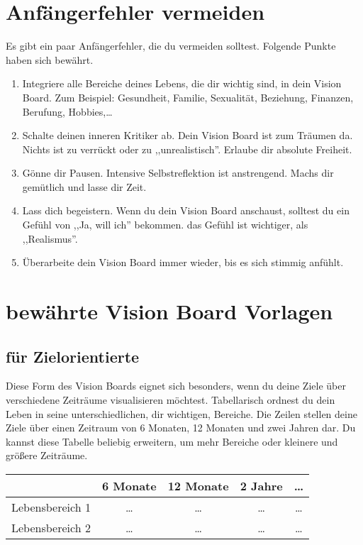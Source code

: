 \documentclass[../Lebensziel.tex]{subfiles}
\begin{document}
\section{Anfängerfehler vermeiden}
Es gibt ein paar Anfängerfehler, die du vermeiden solltest. Folgende Punkte haben sich bewährt.
\begin{enumerate}
    \item Integriere alle Bereiche deines Lebens, die dir wichtig sind, in dein Vision Board. Zum Beispiel: Gesundheit, Familie, Sexualität, Beziehung, Finanzen, Berufung, Hobbies,\dots
    \item Schalte deinen inneren Kritiker ab. Dein Vision Board ist zum Träumen da. Nichts ist zu verrückt oder zu ,,unrealistisch''. Erlaube dir absolute Freiheit.
    \item Gönne dir Pausen. Intensive Selbstreflektion ist anstrengend. Machs dir gemütlich und lasse dir Zeit.
    \item Lass dich begeistern. Wenn du dein Vision Board anschaust, solltest du ein Gefühl von ,,Ja, will ich'' bekommen. das Gefühl ist wichtiger, als ,,Realismus''.
    \item Überarbeite dein Vision Board immer wieder, bis es sich stimmig anfühlt.
\end{enumerate}

\section{bewährte Vision Board Vorlagen}
\subsection{für Zielorientierte}
Diese Form des Vision Boards eignet sich besonders, wenn du deine Ziele über verschiedene Zeiträume visualisieren möchtest. Tabellarisch ordnest du dein Leben in seine unterschiedlichen, dir wichtigen, Bereiche. Die Zeilen stellen deine Ziele über einen Zeitraum von 6 Monaten, 12 Monaten und zwei Jahren dar. Du kannst diese Tabelle beliebig erweitern, um mehr Bereiche oder kleinere und größere Zeiträume.

\begin{center}
    \begin{tabular}{c|c|c|c|c}
                        & 6 Monate & 12 Monate & 2 Jahre & \dots \\\hline
        Lebensbereich 1 & \dots    & \dots     & \dots   & \dots \\\hline
        Lebensbereich 2 & \dots    & \dots     & \dots   & \dots
    \end{tabular}
\end{center}
\end{document}
